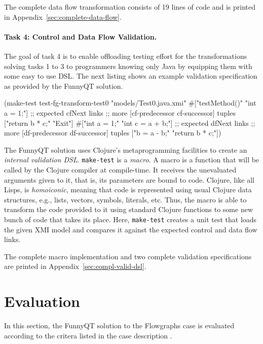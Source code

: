 \documentclass[submission]{eptcs}
\begin{document}
The complete data flow transformation consists of 19 lines of code and is
printed in Appendix~\ref{sec:complete-data-flow}.


\paragraph{Task 4: Control and Data Flow Validation.}
\label{sec:task-4}

The goal of task 4 is to enable offloading testing effort for the
transformations solving tasks 1 to 3 to programmers knowing only Java by
equipping them with some easy to use DSL.  The next listing shows an example
validation specification as provided by the FunnyQT solution.

\begin{clojurecode}
(make-test test-fg-transform-test0 "models/Test0.java.xmi"
           #{["testMethod()"   "int a = 1;"]     ;; expected cfNext links
             ;; more [cf-predecessor cf-successor] tuples
             ["return b * c;"  "Exit"]}
           #{["int a = 1;"     "int c = a + b;"] ;; expected dfNext links
             ;; more [df-predecessor df-successor] tuples
             ["b = a - b;"     "return b * c;"]})
\end{clojurecode}

The FunnyQT solution uses Clojure's metaprogramming facilities to create an
\emph{internal validation DSL}.  \verb|make-test| is a \emph{macro}.  A macro
is a function that will be called by the Clojure compiler at compile-time.  It
receives the unevaluated arguments given to it, that is, its parameters are
bound to code.  Clojure, like all Lisps, is \emph{homoiconic}, meaning that
code is represented using usual Clojure data structures, e.g., lists, vectors,
symbols, literals, etc.  Thus, the macro is able to transform the code provided
to it using standard Clojure functions to some new bunch of code that takes its
place.  Here, \verb|make-test| creates a unit test that loads the given XMI
model and compares it against the expected control and data flow links.

The complete macro implementation and two complete validation specifications
are printed in Appendix~\ref{sec:compl-valid-dsl}.


\section{Evaluation}
\label{sec:evaluation}

In this section, the FunnyQT solution to the Flowgraphs case is evaluated
according to the critera listed in the case description
\cite{flowgraphcasedesc}.
\end{document}

